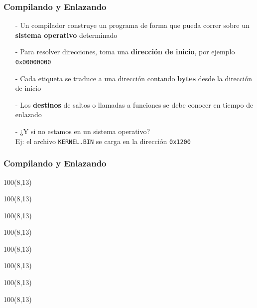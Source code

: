 \documentclass[aspectratio=169]{beamer}
\begin{document}
\begin{frame}
\frametitle{Compilando y Enlazando}
\begin{center}
\begin{itemize}
    \setlength\itemsep{1em}
\item[-] Un compilador construye un programa de forma que pueda correr sobre un \textbf{sistema operativo} determinado
\pause
\item[-] Para resolver direcciones, toma una \textbf{dirección de inicio}, por ejemplo \texttt{0x00000000}
\pause
\item[-] Cada etiqueta se traduce a una dirección contando \textbf{bytes} desde la dirección de inicio
\pause
\item[-] Los \textbf{destinos} de saltos o llamadas a funciones se debe conocer en tiempo de enlazado
\pause
 \vspace{0.2cm}
\item[-] \large \textcolor{naranjauca}{¿Y si no estamos en un sistema operativo?}\\ \vspace{0.2cm} Ej: el archivo \texttt{KERNEL.BIN} se carga en la dirección \texttt{0x1200}
\end{itemize}
\end{center}
\end{frame}

\begin{frame}
    \frametitle{Compilando y Enlazando}
    \begin{textblock}{100}(8,13)
    \end{textblock}
    \begin{textblock}{100}(8,13)
    \end{textblock}
    \begin{textblock}{100}(8,13)
    \end{textblock}
    \begin{textblock}{100}(8,13)
    \end{textblock}
    \begin{textblock}{100}(8,13)
    \end{textblock}
    \begin{textblock}{100}(8,13)
    \end{textblock}
    \begin{textblock}{100}(8,13)
    \end{textblock}
    \begin{textblock}{100}(8,13)
    \end{textblock}
\end{frame}
\end{document}
